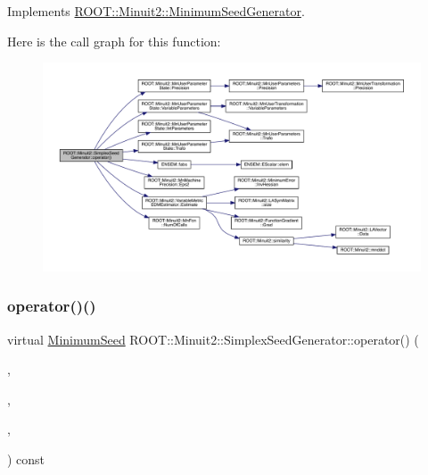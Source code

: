 Implements \mbox{\hyperlink{classROOT_1_1Minuit2_1_1MinimumSeedGenerator_ae71de52027d3f0c7fa202c7cf65b947a}{R\+O\+O\+T\+::\+Minuit2\+::\+Minimum\+Seed\+Generator}}.

Here is the call graph for this function\+:
\nopagebreak
\begin{figure}[H]
\begin{center}
\leavevmode
\includegraphics[width=350pt]{d3/d36/classROOT_1_1Minuit2_1_1SimplexSeedGenerator_aa0c427acb85f9a47a0abaecbf85b1f5c_cgraph}
\end{center}
\end{figure}
\mbox{\label{classROOT_1_1Minuit2_1_1SimplexSeedGenerator_a48f1bb260753e6c6f053072d4754a028}} 
\subsubsection{\texorpdfstring{operator()()}{operator()()}\hspace{0.1cm}{\footnotesize\ttfamily [2/6]}}
{\footnotesize\ttfamily virtual \mbox{\hyperlink{classROOT_1_1Minuit2_1_1MinimumSeed}{Minimum\+Seed}} R\+O\+O\+T\+::\+Minuit2\+::\+Simplex\+Seed\+Generator\+::operator() (\begin{DoxyParamCaption}\item[{const \mbox{\hyperlink{classROOT_1_1Minuit2_1_1MnFcn}{Mn\+Fcn}} \&}]{,  }\item[{const \mbox{\hyperlink{classROOT_1_1Minuit2_1_1GradientCalculator}{Gradient\+Calculator}} \&}]{,  }\item[{const \mbox{\hyperlink{classROOT_1_1Minuit2_1_1MnUserParameterState}{Mn\+User\+Parameter\+State}} \&}]{,  }\item[{const \mbox{\hyperlink{classROOT_1_1Minuit2_1_1MnStrategy}{Mn\+Strategy}} \&}]{ }\end{DoxyParamCaption}) const\hspace{0.3cm}{\ttfamily [virtual]}}



